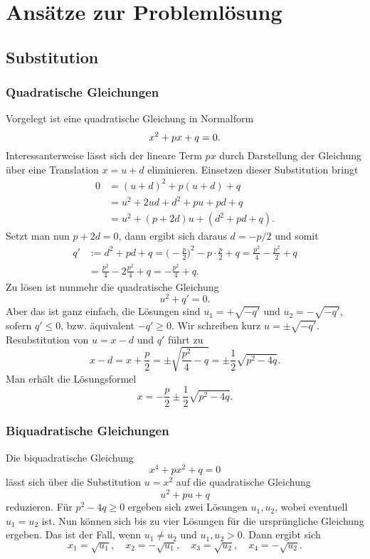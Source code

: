
\chapter{Ansätze zur Problemlösung}

\section{Substitution}

\subsection{Quadratische Gleichungen}%

Vorgelegt ist eine quadratische Gleichung in Normalform
\begin{equation*}\index{Normalform!einer quadratischen Gleichung}
x^2+px+q = 0.
\end{equation*}
Interessanterweise lässt sich der lineare Term $px$ durch Darstellung
der Gleichung über eine Translation $x=u+d$ eliminieren. Einsetzen
dieser Substitution bringt
\begin{align*}
0 &= (u+d)^2+p(u+d)+q\\
&= u^2+2ud+d^2+pu+pd+q\\
&= u^2+(p+2d)u+(d^2+pd+q).
\end{align*}
Setzt man nun $p+2d=0$, dann ergibt sich daraus $d=-p/2$ und somit
\begin{align*}
q' &:= d^2+pd+q = \Big(-\frac{p}{2}\Big)^2-p\cdot\frac{p}{2}+q
= \frac{p^2}{4}-\frac{p^2}{2}+q\\
&= \frac{p^2}{4}-2\frac{p^2}{4}+q = -\frac{p^2}{4}+q.
\end{align*}
Zu lösen ist nunmehr die quadratische Gleichung
\[u^2+q' = 0.\]
Aber das ist ganz einfach, die Lösungen sind $u_1=+\sqrt{-q'}$
und $u_2=-\sqrt{-q'}$, sofern $q'\le 0$,
bzw. äquivalent $-q'\ge 0$. Wir schreiben kurz $u=\pm\sqrt{-q'}$.
Resubstitution von $u=x-d$ und $q'$ führt zu
\[x-d = x+\frac{p}{2} = \pm\sqrt{\frac{p^2}{4}-q}
= \pm\frac{1}{2}\sqrt{p^2-4q}.\]
Man erhält die Lösungsformel
\[x = -\frac{p}{2}\pm\frac{1}{2}\sqrt{p^2-4q}.\]

\subsection{Biquadratische Gleichungen}%
Die biquadratische Gleichung
\[x^4+px^2+q = 0\]
lässt sich über die Substitution $u=x^2$ auf die quadratische Gleichung
\[u^2+pu+q\]
reduzieren. Für $p^2-4q\ge 0$ ergeben sich zwei Lösungen $u_1,u_2$,
wobei eventuell $u_1=u_2$ ist. Nun können sich bis zu vier Lösungen
für die ursprüngliche Gleichung ergeben. Das ist der Fall,
wenn $u_1\ne u_2$ und $u_1,u_2>0$. Dann
ergibt sich
\[
x_1=\sqrt{u_1},\quad x_2=-\sqrt{u_1},\quad
x_3=\sqrt{u_2},\quad x_4=-\sqrt{u_2}.
\]

